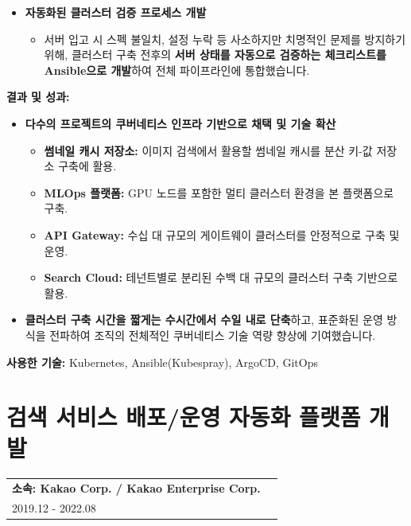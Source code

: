 \documentclass[letterpaper,11pt]{article}
\makeatletter
\newcommand{\resumeProject}[2]{
  \vspace{-1pt}\item
    \begin{tabular*}{0.97\textwidth}[t]{l@{\extracolsep{\fill}}r}
      \textbf{#1} \\
      \small{#2} \\
    \end{tabular*}\vspace{-5pt}
}
\makeatother
\begin{document}
{\begin{itemize}[leftmargin=*]
          \item \textbf{자동화된 클러스터 검증 프로세스 개발}
              \begin{itemize}[leftmargin=*, label=$\circ$]
                  \item 서버 입고 시 스펙 불일치, 설정 누락 등 사소하지만 치명적인 문제를 방지하기 위해, 클러스터 구축 전후의 \textbf{서버 상태를 자동으로 검증하는 체크리스트를 Ansible으로 개발}하여 전체 파이프라인에 통합했습니다.
              \end{itemize}
      \end{itemize}

      \textbf{결과 및 성과:}
      \begin{itemize}[leftmargin=*]
          \item \textbf{다수의 프로젝트의 쿠버네티스 인프라 기반으로 채택 및 기술 확산}
              \begin{itemize}[leftmargin=*, label=$\circ$]
                  \item \textbf{썸네일 캐시 저장소:} 이미지 검색에서 활용할 썸네일 캐시를 분산 키-값 저장소 구축에 활용.
                  \item \textbf{MLOps 플랫폼:} GPU 노드를 포함한 멀티 클러스터 환경을 본 플랫폼으로 구축.
                  \item \textbf{API Gateway:} 수십 대 규모의 게이트웨이 클러스터를 안정적으로 구축 및 운영.
                  \item \textbf{Search Cloud:} 테넌트별로 분리된 수백 대 규모의 클러스터 구축 기반으로 활용.
              \end{itemize}
          \item \textbf{클러스터 구축 시간을 짧게는 수시간에서 수일 내로 단축}하고, 표준화된 운영 방식을 전파하여 조직의 전체적인 쿠버네티스 기술 역량 향상에 기여했습니다.
      \end{itemize}

      \textbf{사용한 기술:} Kubernetes, Ansible(Kubespray), ArgoCD, GitOps
    }

  \resumeProjectListEnd

\section{\textbf{검색 서비스 배포/운영 자동화 플랫폼 개발}}
  \resumeProjectListStart
    \resumeProject
    {\textbf{소속}: Kakao Corp. / Kakao Enterprise Corp.} {2019.12 - 2022.08}
    
\end{document}
